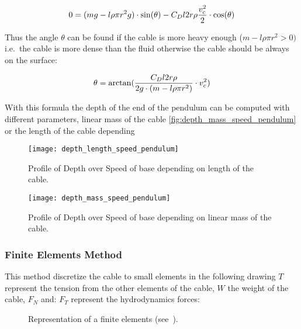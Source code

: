 \begin{equation}
 0 = (m g - l \rho \pi r^2 g) \cdot \sin(\theta)-C_D l 2 r \rho \frac{v_c^2}{2} \cdot \cos(\theta)\\
 \label{equ_Stab_2}
\end{equation}

Thus the angle $\theta$ can be found if the cable is more heavy enough ($m -l \rho \pi r^2 > 0)$ i.e.\ the cable is more dense than the fluid otherwise the cable should be always on the surface:

\begin{equation}
 \theta = \arctan(\frac{C_D l 2 r \rho}{2 g \cdot (m - l \rho \pi r^2)} \cdot v_c^2)\\
 \label{equ_theta_1}
 \end{equation}
 
With this formula the depth of the end of the pendulum can be computed with different parameters, linear mass of the cable \ref{fig:depth_mass_speed_pendulum}  or the length of the cable depending 
 
 \begin{figure}[H]
\centering
    \begin{minipage}[b]{0.4\textwidth}
    \centering
    \texttt{[image: depth\_length\_speed\_pendulum]}
    \caption{Profile of Depth over Speed of base depending on length of the cable.}
    \label{fig:depth_mass_speed_pendulum}
    \end{minipage}
    \hfill
    \begin{minipage}[b]{0.4\textwidth}
    \centering
    \texttt{[image: depth\_mass\_speed\_pendulum]}
    \caption{Profile of Depth over Speed of base depending on linear mass of the cable.}
    \label{fig:depth_length_speed_pendulum}
    \end{minipage}
\end{figure}

\subsubsection*{Finite Elements Method}
 
 
 This method discretize the cable to small elements in the following drawing $T$ represent the tension from the other elements of the cable, $W$ the weight of the cable, $F_N$ and: $F_T$ represent the hydrodynamics forces:
 
\begin{figure}[H]
\centering
{} %
{

}
    \caption{Representation of a finite elements (see~\cite{obligado2013experimental}).}
    \label{fig:finite_elem}
\end{figure}

